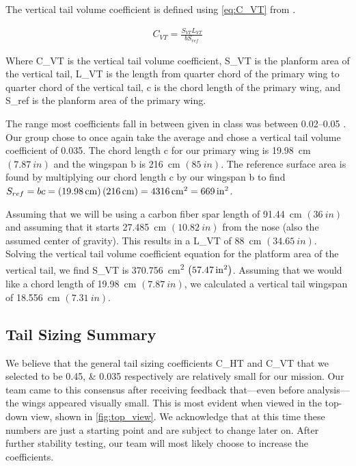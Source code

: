 The vertical tail volume coefficient is defined using \autoref{eq:C_VT} from \citet{grager2024}.

\begin{align}
    C_{VT} = \frac{S_{VT} L_{VT}}{b S_{ref}}\label{eq:C_VT}
\end{align}

\noindent{}Where \gls{C_VT} is the vertical tail volume coefficient, \gls{S_VT} is the planform area of the vertical tail, \gls{L_VT} is the length from quarter chord of the primary wing to quarter chord of the vertical tail, \gls{c} is the chord length of the primary wing, and \gls{S_ref} is the planform area of the primary wing.

The range most coefficients fall in between given in class was between \numrange{0.02}{0.05} \citep{grager2024}. Our group chose to once again take the average and chose a vertical tail volume coefficient of \num{0.035}. The chord length \gls{c} for our primary wing is \qty{19.98}{\centi\meter} $\left(\qty{7.87}{in}\right)$ and the wingspan \gls{b} is \qty{216}{\centi\meter} $\left(\qty{85}{in}\right)$. The reference surface area is found by multiplying our chord length \gls{c} by our wingspan \gls{b} to find $S_{ref} = bc = \left(\qty{19.98}{\centi\meter}\right)\left(\qty{216}{\centi\meter}\right) = \qty{4316}{\centi\meter\squared} = \qty{669}{in\squared}$.

Assuming that we will be using a carbon fiber spar length of \qty{91.44}{\centi\meter} $\left(\qty{36}{in}\right)$ and assuming that it starts \qty{27.485}{\centi\meter} $\left(\qty{10.82}{in}\right)$ from the nose (also the assumed center of gravity). This results in a \gls{L_VT} of \qty{88}{\centi\meter} $\left(\qty{34.65}{in}\right)$. Solving the vertical tail volume coefficient equation for the platform area of the vertical tail, we find \gls{S_VT} is \qty{370.756}{\centi\meter\squared} $\left(\qty{57.47}{in\squared}\right)$. Assuming that we would like a chord length of \qty{19.98}{\centi\meter} $\left(\qty{7.87}{in}\right)$, we calculated a vertical tail wingspan of \qty{18.556}{\centi\meter} $\left(\qty{7.31}{in}\right)$.

\subsection{Tail Sizing Summary}

We believe that the general tail sizing coefficients \gls{C_HT} and \gls{C_VT} that we selected to be \numlist{0.45;0.035} respectively are relatively small for our mission. Our team came to this consensus after receiving feedback that—even before analysis—the wings appeared visually small. This is most evident when viewed in the top-down view, shown in \autoref{fig:top_view}. We acknowledge that at this time these numbers are just a starting point and are subject to change later on. After further stability testing, our team will most likely choose to increase the coefficients.

